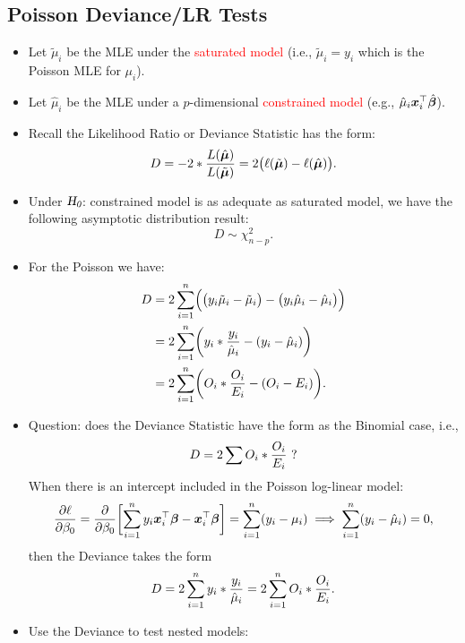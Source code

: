 \documentclass{article}\usepackage[]{graphicx}\usepackage[svgnames]{xcolor}
\let\exp\relax%
\let\log\relax%
\newcommand{\HN}{\textsl{H}_{\textsl{0}}}%
\providecommand{\Vector}[1]{\bm{#1}}%
\begin{document}
\subsection*{Poisson Deviance/LR Tests}
\begin{itemize}
      \item Let $ \tilde{\mu}_i $ be the MLE under the \textcolor{Red}{saturated model} (i.e., $ \tilde{\mu}_i=y_i $ which is the Poisson MLE for $ \mu_i $).
      \item Let $ \hat{\mu}_i $ be the MLE under a $ p $-dimensional \textcolor{Red}{constrained model} (e.g., $ \hat{\mu}_i\exp{\Vector{x}_i^\top \hat{\Vector{\beta}}} $).
      \item Recall the Likelihood Ratio or Deviance Statistic has the form:
            \[ D=-2\log*{\frac{L(\hat{\Vector{\mu}})}{L(\tilde{\Vector{\mu}})}}=2\bigl(\ell(\tilde{\Vector{\mu}})-\ell(\hat{\Vector{\mu}})\bigr). \]
      \item Under $ \HN $: constrained model is as adequate as saturated model, we have the following asymptotic distribution result:
            \[ D \sim \chi^2_{n-p}. \]
      \item For the Poisson we have:
            \begin{align*}
                  D
                   & =2 \sum_{i=1}^{n} \Bigl(\bigl(y_i\log{\tilde{\mu}_i}-\tilde{\mu}_i\bigr)-\bigl(y_i\log{\hat{\mu}_i}-\hat{\mu}_i\bigr)\Bigr) \\
                   & =2 \sum_{i=1}^{n} \biggl(y_i\log*{\frac{y_i}{\hat{\mu}_i}}-(y_i-\hat{\mu}_i)\biggr)                                         \\
                   & =2 \sum_{i=1}^{n} \biggl(O_i\log*{\frac{O_i}{E_i}}-(O_i-E_i)\biggr).
            \end{align*}
      \item Question: does the Deviance Statistic have the form as the Binomial case, i.e.,
            \[ D=2\sum O_i\log*{\frac{O_i}{E_i}}\text{ ?} \]
            When there is an intercept included in the Poisson log-linear model:
            \[ \pdv{\ell}{\beta_0}=\pdv*{\biggl[\sum_{i=1}^{n} y_i \Vector{x}_i^\top \Vector{\beta}-\exp{\Vector{x}_i^\top \Vector{\beta}}\biggr]}{\beta_0}
                  =\sum_{i=1}^{n} (y_i-\mu_i)\implies \sum_{i=1}^{n} (y_i-\hat{\mu}_i)=0, \]
            then the Deviance takes the form
            \[ D=2 \sum_{i=1}^{n} y_i\log*{\frac{y_i}{\hat{\mu}_i}}=2 \sum_{i=1}^{n} O_i \log*{\frac{O_i}{E_i}}. \]
      \item Use the Deviance to test nested models:

\end{itemize}
\end{document}
